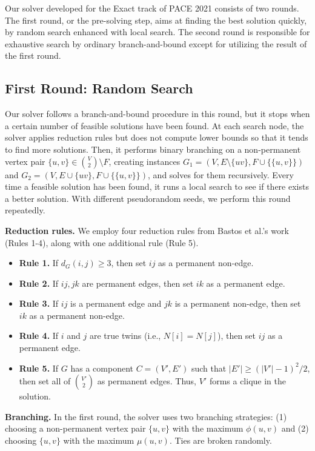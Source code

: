 \documentclass[a4paper,UKenglish,cleveref, autoref, thm-restate]{lipics-v2021}
\begin{document}
Our solver developed for the Exact track of PACE 2021 consists of two rounds. The first round, or the pre-solving step, aims at finding the best solution quickly, by random search enhanced with local search. The second round is responsible for exhaustive search by ordinary branch-and-bound except for utilizing the result of the first round.

\subsection{First Round: Random Search}

Our solver follows a branch-and-bound procedure in this round, but it stops when a certain number of feasible solutions have been found. At each search node, the solver applies reduction rules but does not compute lower bounds so that it tends to find more solutions. Then, it performs binary branching on a non-permanent vertex pair $\{u,v\} \in \binom{V}{2} \setminus F$, creating instances $G_1=(V,E \setminus \{uv\}, F \cup \{\{u,v\}\})$ and $G_2 = (V,E \cup \{uv\}, F \cup \{\{u,v\}\})$, and solves for them recursively. Every time a feasible solution has been found, it runs a local search to see if there exists a better solution. With different pseudorandom seeds, we perform this round repeatedly.

\textbf{Reduction rules.} We employ four reduction rules from Bastos et al.'s work \cite{bastos2016efficient} (Rules 1-4), along with one additional rule (Rule 5).

\begin{itemize}
    \item \textbf{Rule 1.} If $d_G(i,j) \geq 3$, then set $ij$ as a permanent non-edge.
    \item \textbf{Rule 2.} If $ij, jk$ are permanent edges, then set $ik$ as a permanent edge.
    \item \textbf{Rule 3.} If $ij$ is a permanent edge and $jk$ is a permanent non-edge, then set $ik$ as a permanent non-edge.
    \item \textbf{Rule 4.} If $i$ and $j$ are true twins (i.e., $N[i]=N[j]$), then set $ij$ as a permanent edge.
    \item \textbf{Rule 5.} If $G$ has a component $C=(V', E')$ such that $|E'| \geq (|V'| - 1)^2 / 2$, then set all of $\binom{V'}{2}$ as permanent edges. Thus, $V'$ forms a clique in the solution.
\end{itemize}

\textbf{Branching.} In the first round, the solver uses two branching strategies: (1) choosing a non-permanent vertex pair $\{u,v\}$ with the maximum $\phi(u,v)$ and (2) choosing $\{u,v\}$ with the maximum $\mu(u,v)$. Ties are broken randomly.
\end{document}
